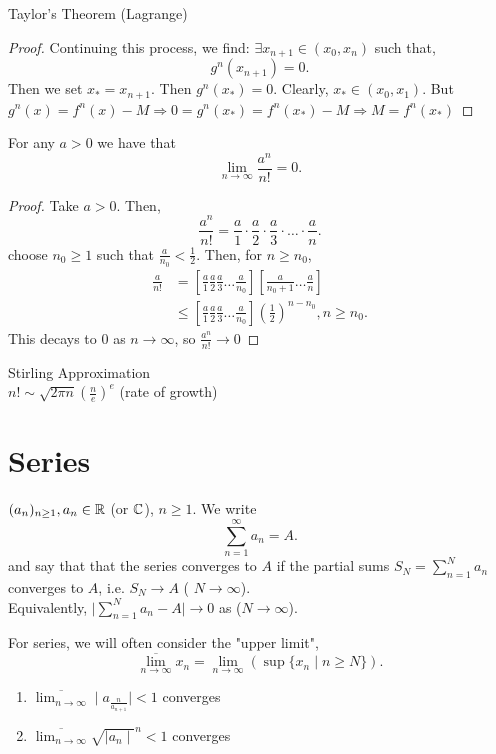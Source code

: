 \documentclass[a4paper]{article}
\begin{document}
\begin{theorem}{Taylor's Theorem (Lagrange)}
\begin{proof}
  Continuing this process, we find: $\exists  x_{n+1} \in (x_0, x_{n}) $ such that, 
  \[
  g^{n} (x_{n+1}) =0
  .\] 
  Then we set $x_{*} = x_{n+1}$. Then $g^{n} (x_{*}) = 0$. Clearly, $x_{*} \in (x_0,x_1)$. But $g^{n} (x) = f^{n}(x) - M \Rightarrow 0 = g^{n} (x_{*}) = f^{n} (x_{*}) -M \Rightarrow M = f^{n} (x_{*}) $

  \end{proof}
\end{theorem}

\begin{lemma}
For any $a > 0$ we have that 
\[
\lim_{n \to \infty} \frac{a^{n}}{n!} = 0
.\] 

\begin{proof}
  Take $a > 0$. Then,  \[
  \frac{a^{n}}{n!} = \frac{a}{1} \cdot \frac{a}{2} \cdot \frac{a}{3}  \cdot \ldots \cdot \frac{a}{n}
  .\] 
  choose $n_0 \geq 1$ such that $\frac{a}{n_0} < \frac{1}{2}$. Then, for $n \geq n_0$, 
  \begin{align*}
    \frac{a}{n!} &= [\frac{a}{1}\frac{a}{2}\frac{a}{3} \ldots \frac{a}{n_0}] [\frac{a}{n_0+1} \ldots \frac{a}{n}] \\
                 &\leq [\frac{a}{1}\frac{a}{2}\frac{a}{3} \ldots \frac{a}{n_0}] (\frac{1}{2})^{n-n_0}, n \geq n_0 
  .\end{align*}
  This decays to 0 as $n \to \infty$, so $\frac{a^{n}}{n!} \to 0$
\end{proof}
\end{lemma}

\begin{lemma}{Stirling Approximation}\\
  $n! \sim \sqrt{2 \pi n} \left( \frac{n}{e} \right)^{e}  $ (rate of growth)
\end{lemma}

\section{Series}
 \begin{definition}
$(a_{n})_{n \geq 1}, a_n \in \mathbb{R} $ (or $\mathbb{C}$),  $n \geq 1$. We write 
   \[
  \sum^{\infty}_{n=1} a_n = A 
  .\] 
  and say that that the series converges to $A$ if the partial sums  $S_N = \sum_{n=1}^{N} a_n$ converges to $A$, i.e. $S_N \to A$ ( $N \to \infty$). \\

  Equivalently,  $\mid \sum_{n=1}^{N} a_n - A \mid  \to 0$ as ($N \to \infty$). 
\end{definition}

\begin{definition}
  For series, we will often consider the "upper limit",
  \[
    \overline{\lim_{n \to \infty}} x_n = \lim_{n \to \infty} (\sup \{x_n \mid n \geq N\}) 
  .\] 
  \begin{enumerate}
    \item $\overline{\lim_{n \to \infty}} \mid a_\frac{n}{a_{n+1}}\mid  < 1$ converges
    \item $\overline{\lim_{n \to \infty}} \sqrt{\mid a_n\mid }^{n} < 1$ converges
  \end{enumerate}
\end{definition}
\end{document}
